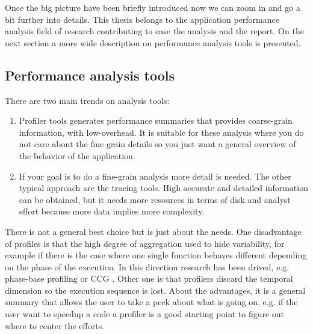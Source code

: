 Once the big picture have been briefly introduced now we can zoom in and go a
bit further into details. This thesis belongs to the application performance 
analysis field of research contributing to ease the analysis and the report. 
On the next section a more wide description on performance analysis tools is
presented.

\subsection{Performance analysis tools}

There are two main trends on analysis tools:
\begin{enumerate}[label=\roman*)]
    \item Profiler tools 
      generates performance summaries that provides coarse-grain information, 
      with low-overhead. It is suitable for these analysis where you do not care
      about the fine grain details so you just want a general overview of the
      behavior of the application.
    \item If your goal is to do a fine-grain analysis more detail is needed. The 
      other typical approach are the tracing tools. High accurate and detailed 
      information can be obtained, but it needs more resources in terms of disk 
      and analyst effort because more data implies more complexity.
\end{enumerate}
There is not a general best choice but is just about the needs. One
disadvantage of profiles is that the high degree of aggregation used to hide
variability, for example if there is the case where one single function
behaves different depending on the phase of the execution. In this direction
research has been drived, e.g. phase-base profiling \cite{malony2005phase} or
CCG \cite{knupfer2005construction}. Other one is
that profilers discard the temporal dimension so the execution sequence is lost.
About the advantages, it is a general summary that allows the user to take a
peek about what is going on, e.g. if the user want to speedup a code a profiler
is a good starting point to figure out where to center the efforts. 

